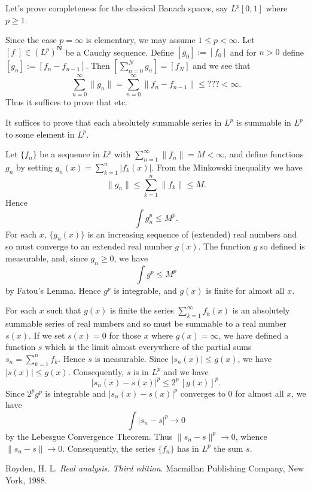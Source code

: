 \documentclass[12pt]{article}
\begin{document}
Let's prove completeness for the classical Banach spaces, say $L^p[0,1]$
where $p \geq 1$. 

Since the case $p=\infty$ is elementary, we may assume $1 \le p < \infty$. 
Let $[f_{\cdot}] \in (L^p)^{\mathbf{N}}$ be a Cauchy sequence. Define $[g_0] := [f_0]$ and for $n > 0$ define $[g_n] := [f_n - f_{n-1}]$. Then $[\sum_{n=0}^N g_n] = [f_N]$ and we see that
$$\sum_{n=0}^\infty \|g_n\| = \sum_{n=0}^\infty \|f_n - f_{n-1}\| \leq ??? < \infty.$$
Thus it suffices to prove that etc.

It suffices to prove that each absolutely summable series in $L^p$ is 
summable in $L^p$ to some element in $L^p$.

Let $\{f_n\}$ be a sequence in $L^p$ with 
$\sum_{n=1}^\infty \|f_n\|=M<\infty$, and define functions $g_n$ by 
setting $g_n(x)=\sum_{k=1}^n|f_k(x)|$. From the Minkowski inequality we 
have
$$
\|g_n\|\le\sum_{k=1}^n\|f_k\|\le M.
$$
Hence
$$
\int g_n^p\le M^p.
$$
For each $x$, $\{g_n(x)\}$ is an increasing sequence of (extended) real 
numbers and so must converge to an extended real number $g(x)$. The 
function $g$ so defined is measurable, and, since $g_n\ge 0$, we have
$$
\int g^p\le M^p
$$
by Fatou's Lemma. Hence $g^p$ is integrable, and $g(x)$ is finite for 
almost all $x$.

For each $x$ such that $g(x)$ is finite the series $\sum_{k=1}^\infty f_k(x)$ 
is an absolutely summable series of real numbers and so must be summable 
to a real number $s(x)$. If we set $s(x)=0$ for those $x$ where 
$g(x)=\infty$, we have defined a function $s$ which is the limit almost 
everywhere of the partial sums $s_n=\sum_{k=1}^n f_k$. Hence $s$ is 
measurable. Since $|s_n(x)|\le g(x)$, we have $|s(x)|\le g(x)$. 
Consequently, $s$ is in $L^p$ and we have
$$
|s_n(x)-s(x)|^p\le 2^p\,[g(x)]^p.
$$
Since $2^pg^p$ is integrable and $|s_n(x)-s(x)|^p$ converges to $0$ for 
almost all $x$, we have
$$
\int|s_n-s|^p\to 0
$$
by the Lebesgue Convergence Theorem. Thus $\|s_n-s\|^p\to 0$, whence 
$\|s_n-s\|\to 0$. Consequently, the series $\{f_n\}$ has in $L^p$ the sum 
$s$.
\begin{thebibliography}
{}Royden, H. L. \emph{Real analysis. Third edition}. Macmillan Publishing Company, New York, 1988.
\end{thebibliography}
\end{document}

